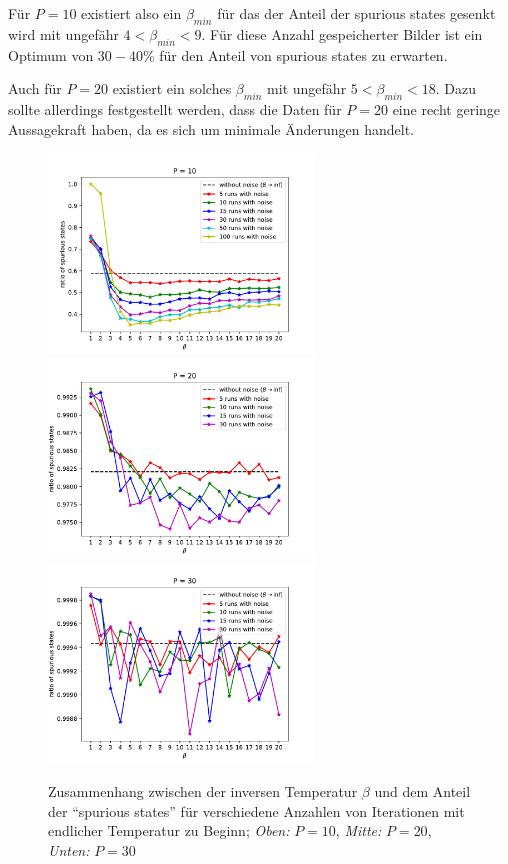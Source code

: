 \documentclass[12pt,a4paper]{article}
\begin{document}
Für $P = 10$ existiert also ein $\beta_{min}$ für das der Anteil der spurious states gesenkt wird mit ungefähr $4 < \beta_{min} < 9$. Für diese Anzahl gespeicherter Bilder ist ein Optimum von $30 - 40 \%$ für den Anteil von spurious states zu erwarten.

Auch für $P = 20$ existiert ein solches $\beta_{min}$ mit ungefähr $5 < \beta_{min} < 18$. Dazu sollte allerdings festgestellt werden, dass die Daten für $P=20$ eine recht geringe Aussagekraft haben, da es sich um minimale Änderungen handelt.

\begin{figure}[p]
\centering
    \vspace{-0.5cm}
    \includegraphics[width=0.63\textwidth]{../pics/fig_P10_w-noise.pdf}
    \includegraphics[width=0.63\textwidth]{../pics/fig_P20_w-noise.pdf}
    \includegraphics[width=0.63\textwidth]{../pics/fig_P30_w-noise.pdf}
    \caption{Zusammenhang zwischen der inversen Temperatur $\beta$ und dem Anteil der "`spurious states"' für verschiedene Anzahlen von Iterationen mit endlicher Temperatur zu Beginn; \textit{Oben:} $P = 10$, \textit{Mitte:} $P = 20$, \textit{Unten:} $P = 30$}
    \label{P10}
\end{figure}
\end{document}
